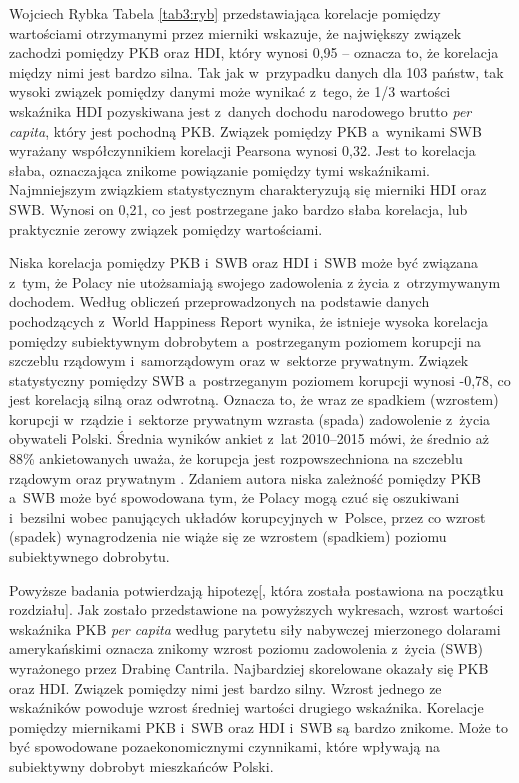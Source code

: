 \begin{artplenv}{Wojciech Rybka}
Tabela \ref{tab3:ryb} przedstawiająca korelacje pomiędzy wartościami otrzymanymi przez mierniki wskazuje, że największy związek
zachodzi pomiędzy PKB oraz HDI, który wynosi 0,95 -- oznacza to, że korelacja między nimi jest bardzo silna. Tak
jak w~przypadku danych dla 103 państw, tak wysoki związek pomiędzy danymi może wynikać z~tego, że 1/3 wartości wskaźnika HDI
pozyskiwana jest z~danych dochodu narodowego brutto \textit{per capita}, który jest pochodną PKB. Związek pomiędzy
PKB a~wynikami SWB wyrażany współczynnikiem korelacji Pearsona wynosi 0,32. Jest to korelacja słaba, oznaczająca znikome
powiązanie pomiędzy tymi wskaźnikami. Najmniejszym związkiem statystycznym charakteryzują się mierniki HDI oraz SWB.
Wynosi on 0,21, co jest postrzegane jako bardzo słaba korelacja, lub praktycznie zerowy związek pomiędzy wartościami. 

Niska korelacja pomiędzy PKB i~SWB oraz HDI i~SWB może być związana z~tym, że Polacy nie utożsamiają swojego zadowolenia
z życia z~otrzymywanym dochodem. Według obliczeń przeprowadzonych na podstawie danych pochodzących z~World
Happiness Report wynika, że istnieje wysoka korelacja pomiędzy subiektywnym dobrobytem a~postrzeganym poziomem korupcji
na szczeblu rządowym i~samorządowym oraz w~sektorze prywatnym. Związek statystyczny pomiędzy SWB a~postrzeganym
poziomem korupcji wynosi -0,78, co jest korelacją silną oraz odwrotną. Oznacza to, że wraz ze spadkiem (wzrostem)
korupcji w~rządzie i~sektorze prywatnym wzrasta (spada) zadowolenie z~życia obywateli Polski. Średnia wyników
ankiet z~lat 2010--2015 mówi, że średnio aż 88\% ankietowanych uważa, że korupcja jest rozpowszechniona na szczeblu rządowym oraz
prywatnym
\parencite{noauthor_world_2018}.
Zdaniem autora niska zależność pomiędzy PKB a~SWB
może być spowodowana tym, że Polacy mogą czuć się oszukiwani i~bezsilni wobec panujących układów korupcyjnych w~Polsce,
przez co wzrost (spadek) wynagrodzenia nie wiąże się ze wzrostem (spadkiem) poziomu subiektywnego dobrobytu.


Powyższe badania potwierdzają hipotezę[, która została postawiona na początku rozdziału]. Jak zostało przedstawione na
powyższych wykresach, wzrost wartości wskaźnika PKB \textit{per capita} według parytetu siły nabywczej mierzonego dolarami
amerykańskimi oznacza znikomy wzrost poziomu zadowolenia z~życia (SWB) wyrażonego przez Drabinę Cantrila. Najbardziej
skorelowane okazały się PKB oraz HDI. Związek pomiędzy nimi jest bardzo silny.
Wzrost jednego ze wskaźników powoduje wzrost średniej wartości drugiego wskaźnika. Korelacje pomiędzy miernikami
PKB i~SWB oraz HDI i~SWB są bardzo znikome. Może to być spowodowane pozaekonomicznymi czynnikami, które wpływają na
subiektywny dobrobyt mieszkańców Polski.


\end{artplenv}
